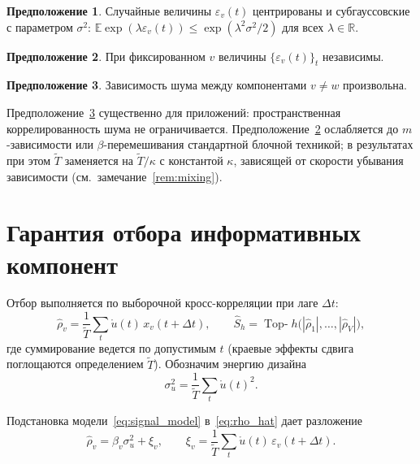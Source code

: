 \documentclass[12pt]{article}
\theoremstyle{plain}
\theoremstyle{definition}
\newtheorem{assumption}{Предположение}
\newcommand{\bbR}{\mathbb{R}}
\newcommand{\bbE}{\mathbb{E}}
\begin{document}
\begin{assumption}\label{as:subgauss}
Случайные величины $\varepsilon_v(t)$ центрированы и субгауссовские с параметром $\sigma^2$: $\bbE \exp(\lambda \varepsilon_v(t)) \le \exp(\lambda^2 \sigma^2 / 2)$ для всех $\lambda \in \bbR$.
\end{assumption}

\begin{assumption}\label{as:time_indep}
При фиксированном $v$ величины $\{\varepsilon_v(t)\}_t$ независимы.
\end{assumption}

\begin{assumption}\label{as:space_arbitrary}
Зависимость шума между компонентами $v \ne w$ произвольна.
\end{assumption}

Предположение~\ref{as:space_arbitrary} существенно для приложений: пространственная коррелированность шума не ограничивается. Предположение~\ref{as:time_indep} ослабляется до $m$-зависимости или $\beta$-перемешивания стандартной блочной техникой; в результатах при этом $\widetilde{T}$ заменяется на $\widetilde{T}/\kappa$ с константой $\kappa$, зависящей от скорости убывания зависимости (см.~замечание~\ref{rem:mixing}).

\section{Гарантия отбора информативных компонент}

Отбор выполняется по выборочной кросс-корреляции при лаге $\Delta t$:
\begin{equation}\label{eq:rho_hat}
\widehat{\rho}_v = \frac{1}{\widetilde{T}} \sum_{t} \mathring{u}(t)\, x_v(t + \Delta t),
\qquad
\widehat{S}_h = \operatorname*{Top-}h \big( |\widehat{\rho}_1|, \ldots, |\widehat{\rho}_V| \big),
\end{equation}
где суммирование ведется по допустимым $t$ (краевые эффекты сдвига поглощаются определением $\widetilde{T}$). Обозначим энергию дизайна
\[
\sigma_u^2 = \frac{1}{\widetilde{T}} \sum_t \mathring{u}(t)^2 .
\]

Подстановка модели~\eqref{eq:signal_model} в~\eqref{eq:rho_hat} дает разложение
\begin{equation}\label{eq:decomp}
\widehat{\rho}_v = \beta_v \sigma_u^2 + \xi_v,
\qquad
\xi_v = \frac{1}{\widetilde{T}} \sum_t \mathring{u}(t)\, \varepsilon_v(t + \Delta t).
\end{equation}
\end{document}
